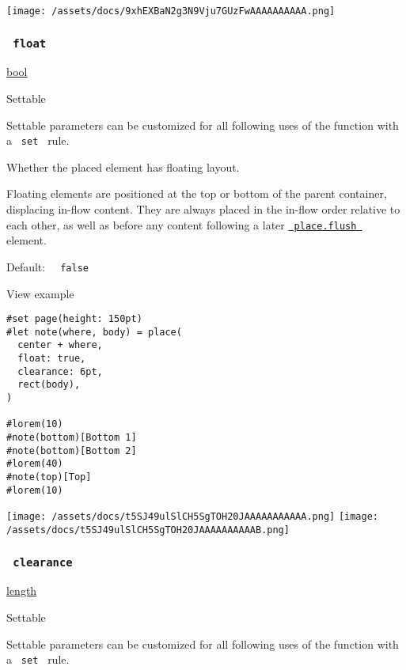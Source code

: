 \texttt{[image: /assets/docs/9xhEXBaN2g3N9Vju7GUzFwAAAAAAAAAA.png]}

\subsubsection{\texorpdfstring{\texttt{\ float\ }}{ float }}\label{parameters-float}

\href{/docs/reference/foundations/bool/}{bool}

{{ Settable }}

\label{parameters-float-settable-tooltip}
Settable parameters can be customized for all following uses of the
function with a \texttt{\ set\ } rule.

Whether the placed element has floating layout.

Floating elements are positioned at the top or bottom of the parent
container, displacing in-flow content. They are always placed in the
in-flow order relative to each other, as well as before any content
following a later
\href{/docs/reference/layout/place/\#definitions-flush}{\texttt{\ place.flush\ }}
element.

Default: \texttt{\ }{\texttt{\ false\ }}\texttt{\ }


View example

\begin{verbatim}
#set page(height: 150pt)
#let note(where, body) = place(
  center + where,
  float: true,
  clearance: 6pt,
  rect(body),
)

#lorem(10)
#note(bottom)[Bottom 1]
#note(bottom)[Bottom 2]
#lorem(40)
#note(top)[Top]
#lorem(10)
\end{verbatim}

\texttt{[image: /assets/docs/t5SJ49ulSlCH5SgTOH20JAAAAAAAAAAA.png]}
\texttt{[image: /assets/docs/t5SJ49ulSlCH5SgTOH20JAAAAAAAAAAB.png]}

\subsubsection{\texorpdfstring{\texttt{\ clearance\ }}{ clearance }}\label{parameters-clearance}

\href{/docs/reference/layout/length/}{length}

{{ Settable }}

\label{parameters-clearance-settable-tooltip}
Settable parameters can be customized for all following uses of the
function with a \texttt{\ set\ } rule.


